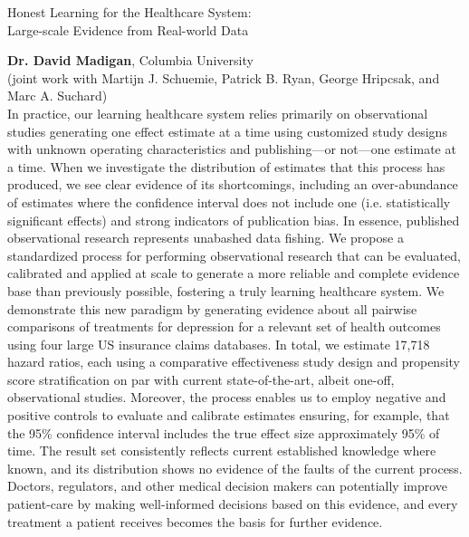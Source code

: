 
\begin{center}
\Large Honest Learning for the Healthcare System: \\ Large-scale
Evidence from Real-world Data \\[1em]
\end{center}
\normalsize \textbf{Dr. David Madigan}, Columbia University \\[.75em]
\footnotesize(joint work with Martijn J. Schuemie, Patrick B. Ryan, George
Hripcsak, and Marc A. Suchard) \\[.5em]

\normalsize In practice, our learning healthcare system relies primarily on
observational studies generating one effect estimate at a time using
customized study designs with unknown operating characteristics and
publishing---or not---one estimate at a time. When we investigate
the distribution of estimates that this process has produced, we see
clear evidence of its shortcomings, including an over-abundance of
estimates where the confidence interval does not include one
(i.e. statistically significant effects) and strong indicators of
publication bias. In essence, published observational research
represents unabashed data fishing. We propose a standardized process
for performing observational research that can be evaluated,
calibrated and applied at scale to generate a more reliable and
complete evidence base than previously possible, fostering a truly
learning healthcare system. We demonstrate this new paradigm by
generating evidence about all pairwise comparisons of treatments for
depression for a relevant set of health outcomes using four large US
insurance claims databases. In total, we estimate 17,718 hazard
ratios, each using a comparative effectiveness study design and
propensity score stratification on par with current state-of-the-art,
albeit one-off, observational studies. Moreover, the process enables
us to employ negative and positive controls to evaluate and calibrate
estimates ensuring, for example, that the 95\% confidence interval
includes the true effect size approximately 95\% of time. The result
set consistently reflects current established knowledge where known,
and its distribution shows no evidence of the faults of the current
process. Doctors, regulators, and other medical decision makers can
potentially improve patient-care by making well-informed decisions
based on this evidence, and every treatment a patient receives becomes
the basis for further evidence.

